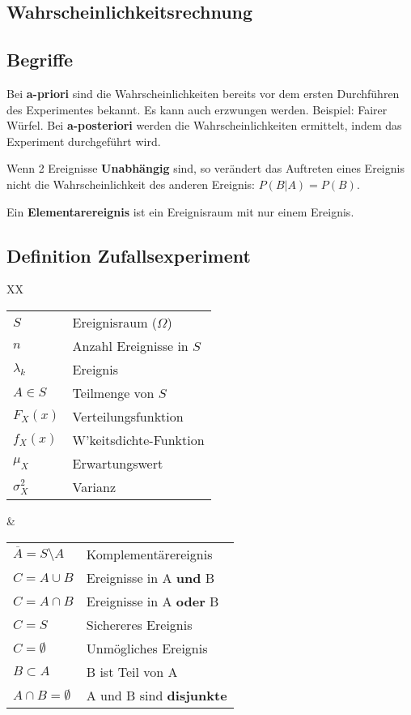 \documentclass[a4paper]{article}
\begin{document}
\begin{twocolumn}
 
\section{Wahrscheinlichkeitsrechnung}

\subsection{Begriffe}
Bei \textbf{a-priori} sind die Wahrscheinlichkeiten bereits vor dem ersten Durchführen des
Experimentes bekannt. Es kann auch erzwungen werden. Beispiel: Fairer Würfel. Bei
\textbf{a-posteriori} werden die Wahrscheinlichkeiten ermittelt, indem das Experiment
durchgeführt wird.

Wenn 2 Ereignisse \textbf{Unabhängig} sind, so verändert das Auftreten eines Ereignis
nicht die Wahrscheinlichkeit des anderen Ereignis: $P(B \vert A) = P(B)$. 

Ein \textbf{Elementarereignis} ist ein Ereignisraum mit nur einem Ereignis.

\subsection{Definition Zufallsexperiment}
\begin{description}
  \begin{tabularx}{\columnwidth}{XX}
    \begin{tabular}{ll}
      $S$ & Ereignisraum ($\Omega$) \\
      $n$ & Anzahl Ereignisse in $S$ \\
      $\lambda_k$ & Ereignis \\
      $A \in S$ & Teilmenge von $S$ \\
      $F_X(x)$ & Verteilungsfunktion \\
      $f_X(x)$ & W'keitsdichte-Funktion \\
      $\mu_X$ & Erwartungswert \\
      $\sigma_X^2$ & Varianz
    \end{tabular} &   
    \begin{tabular}{ll} 
      $\overline{A} = S \setminus A$ & Komplementärereignis \\
      $C = A \cup B$ & Ereignisse in A \textbf{und} B \\
      $C = A \cap B$ & Ereignisse in A \textbf{oder} B\\
      $C = S$ & Sichereres Ereignis \\
      $C = \emptyset$ & Unmögliches Ereignis \\
      $B \subset A$ & B ist Teil von A\\
      $A \cap B = \emptyset$ & A und B sind \textbf{disjunkte} \\
    \end{tabular}
  \end{tabularx}  
\end{description}


\end{twocolumn}
\end{document}
